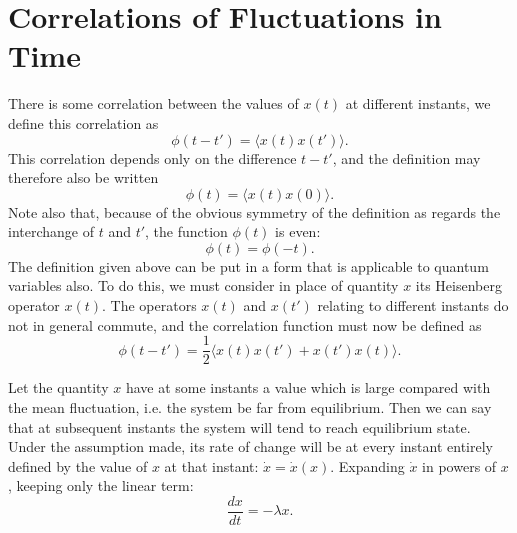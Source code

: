 \documentclass{book}
\newcommand{\average}[1]{\langle#1\rangle}
\numberwithin{equation}{section}
\begin{document}
\section{Correlations of Fluctuations in Time}
There is some correlation between the values of $x(t)$ at different instants,
we define this correlation as
\begin{equation}
  \phi(t-t')=\average{x(t)x(t')}.
\end{equation}
This correlation depends only on the difference $t-t'$, and the
definition may therefore also be written
\begin{equation}
  \phi(t)=\average{x(t)x(0)}.
\end{equation}
Note also that, because of the obvious symmetry of the definition as
regards the interchange of $t$ and $t'$, the function $\phi(t)$ is even:
\begin{equation}
  \phi(t)=\phi(-t).
\end{equation}
The definition given above can be put in a form that is applicable to
quantum variables also. To do this, we must consider in place of
quantity $x$ its Heisenberg operator $x(t)$. The operators $x(t)$ and
$x(t')$ relating to different instants do not in general commute, and
the correlation function must now be defined as
\begin{equation}
  \phi(t-t')=\frac{1}{2}\average{x(t)x(t')+x(t')x(t)}.
\end{equation}

Let the quantity $x$ have at some instants a value which is large
compared with the mean fluctuation, i.e. the system be far from
equilibrium. Then we can say that at subsequent instants the system
will tend to reach equilibrium state. Under the assumption made, its
rate of change will be at every instant entirely defined by the value
of $x$ at that instant: $\dot{x}=\dot{x}(x)$. Expanding $\dot{x}$ in powers of
$x$, keeping only the linear term:
\begin{equation}
  \frac{dx}{dt}=-\lambda x.
\end{equation}
\end{document}
